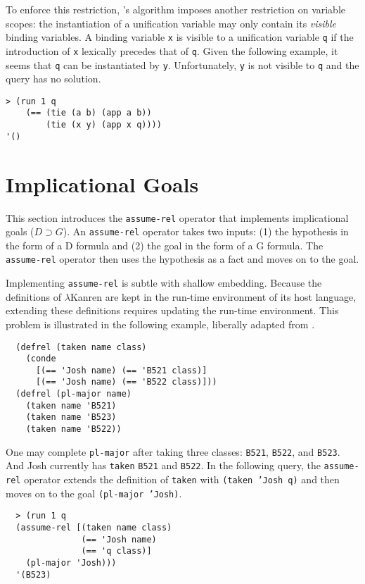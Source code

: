 \documentclass[acmlarge,review]{acmart}
\theoremstyle{definition}
\begin{document}
To enforce this restriction, \citet{miller_logic_1991}'s algorithm
imposes another restriction on variable scopes: the instantiation of a
unification variable may only contain its \emph{visible} binding variables.
A binding variable \texttt{x} is visible to a unification variable \texttt{q} if
the introduction of \texttt{x} lexically precedes that of \texttt{q}.
Given the following example, it seems that \texttt{q} can be instantiated by
\texttt{y}. Unfortunately, \texttt{y} is not visible to \texttt{q} and the
query has no solution.
\begin{lstlisting}
> (run 1 q
    (== (tie (a b) (app a b))
        (tie (x y) (app x q))))
'()
\end{lstlisting}

\section{Implicational Goals}
This section introduces the \texttt{assume-rel} operator that implements
implicational goals ($D \supset G$).
An \texttt{assume-rel} operator takes two inputs: (1) the hypothesis in
the form of a D formula and (2) the goal in the form of a G formula.
The \texttt{assume-rel} operator then uses the hypothesis as a fact and
moves on to the goal.

Implementing \texttt{assume-rel} is subtle with shallow embedding.
Because the definitions of $\lambda$Kanren are kept in the run-time environment
of its host language, extending these definitions requires updating
the run-time environment. This problem is illustrated in the following
example, liberally adapted from \citet[p.~80]{miller_programming_2012}.

\begin{lstlisting}
  (defrel (taken name class)
    (conde
      [(== 'Josh name) (== 'B521 class)]
      [(== 'Josh name) (== 'B522 class)]))
  (defrel (pl-major name)
    (taken name 'B521)
    (taken name 'B523)
    (taken name 'B522))
\end{lstlisting}

One may complete \texttt{pl-major} after taking three classes: \texttt{B521},
\texttt{B522}, and \texttt{B523}. And Josh currently has \texttt{taken}
\texttt{B521} and \texttt{B522}. In the following query, the \texttt{assume-rel}
operator extends the definition of \texttt{taken} with \texttt{(taken 'Josh q)}
and then moves on to the goal \texttt{(pl-major 'Josh)}.

\begin{lstlisting}
  > (run 1 q
  (assume-rel [(taken name class)
               (== 'Josh name)
               (== 'q class)]
    (pl-major 'Josh)))
  '(B523)
\end{lstlisting}
\end{document}

